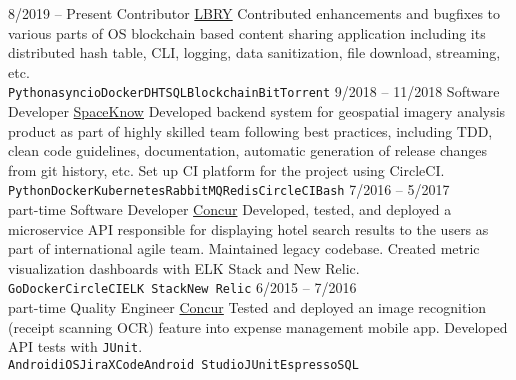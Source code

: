 \documentclass[9pt]{developercv} %
\begin{document}
\begin{entrylist}
	\entry
		{8/2019 -- Present}
		{Contributor}
        {\href{https://github.com/lbryio/lbry-sdk}{LBRY}}
        {
          Contributed enhancements and bugfixes to various parts of OS blockchain based content sharing application including its distributed hash table, CLI, logging, data sanitization, file download, streaming, etc.\\
          \texttt{Python}\slashsep\texttt{asyncio}\slashsep\texttt{Docker}\slashsep\texttt{DHT}\slashsep\texttt{SQL}\slashsep\texttt{Blockchain}\slashsep\texttt{BitTorrent}}
	\entry
		{9/2018 -- 11/2018}
		{Software Developer}
        {\href{https://spaceknow.com/}{SpaceKnow}}
        {Developed backend system for geospatial imagery analysis product as part of highly skilled team following best practices, including TDD, clean code guidelines, documentation, automatic generation of release changes from git history, etc. Set up CI platform for the project using CircleCI.\\
        \texttt{Python}\slashsep\texttt{Docker}\slashsep\texttt{Kubernetes}\slashsep\texttt{RabbitMQ}\slashsep\texttt{Redis}\slashsep\texttt{CircleCI}\slashsep\texttt{Bash}}
	\entry
		{7/2016 -- 5/2017\\\footnotesize{part-time}}
		{Software Developer}
        {\href{https://www.concur.com/}{Concur}}
        {Developed, tested, and deployed a microservice API responsible for displaying hotel search results to the users as part of international agile team. Maintained legacy codebase. Created metric visualization dashboards with ELK Stack and New Relic. \\ 
        \texttt{Go}\slashsep\texttt{Docker}\slashsep\texttt{CircleCI}\slashsep\texttt{ELK Stack}\slashsep\texttt{New Relic}}
	\entry
        {6/2015 -- 7/2016\\\footnotesize{part-time}}
		{Quality Engineer}
        {\href{https://www.concur.com/}{Concur}}
        {Tested and deployed an image recognition (receipt scanning OCR) feature into expense management mobile app. Developed API tests with \texttt{JUnit}.\\
          \texttt{Android}\slashsep\texttt{iOS}\slashsep\texttt{Jira}\slashsep\texttt{XCode}\slashsep\texttt{Android Studio}\slashsep\texttt{JUnit}\slashsep\texttt{Espresso}\slashsep\texttt{SQL}}
\end{entrylist}

\newpage
{}
\end{document}
